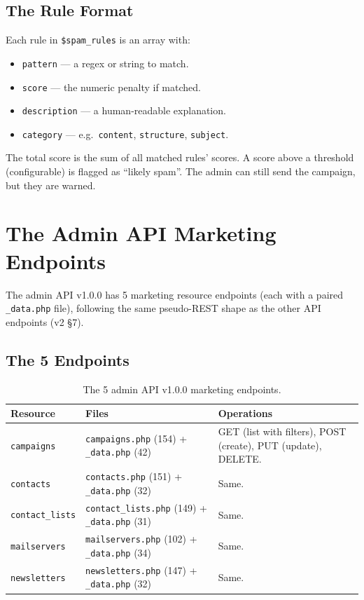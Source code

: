 \documentclass[11pt,a4paper]{article}
\begin{document}
\subsection{The Rule Format}

Each rule in \texttt{\$spam\_rules} is an array with:

\begin{itemize}[leftmargin=1.6em,itemsep=2pt]
  \item \texttt{pattern} --- a regex or string to match.
  \item \texttt{score} --- the numeric penalty if matched.
  \item \texttt{description} --- a human-readable explanation.
  \item \texttt{category} --- e.g.\ \texttt{content},
        \texttt{structure}, \texttt{subject}.
\end{itemize}

The total score is the sum of all matched rules' scores. A score
above a threshold (configurable) is flagged as ``likely spam''.
The admin can still send the campaign, but they are warned.

\section{The Admin API Marketing Endpoints}\label{sec:api}

The admin API v1.0.0 has 5 marketing resource endpoints (each
with a paired \texttt{\_data.php} file), following the same
pseudo-REST shape as the other API endpoints (v2 \S7).

\subsection{The 5 Endpoints}

\begin{table}[htbp]
\centering
\caption{The 5 admin API v1.0.0 marketing endpoints.}\label{tab:api-marketing}
\small
\begin{tabularx}{\columnwidth}{llX}
\toprule
\textbf{Resource} & \textbf{Files} & \textbf{Operations} \\
\midrule
\texttt{campaigns}     & \texttt{campaigns.php} (154) + \texttt{\_data.php} (42) & GET (list with filters), POST (create), PUT (update), DELETE. \\
\texttt{contacts}      & \texttt{contacts.php} (151) + \texttt{\_data.php} (32) & Same. \\
\texttt{contact\_lists}& \texttt{contact\_lists.php} (149) + \texttt{\_data.php} (31) & Same. \\
\texttt{mailservers}   & \texttt{mailservers.php} (102) + \texttt{\_data.php} (34) & Same. \\
\texttt{newsletters}   & \texttt{newsletters.php} (147) + \texttt{\_data.php} (32) & Same. \\
\bottomrule
\end{tabularx}
\end{table}
\end{document}
